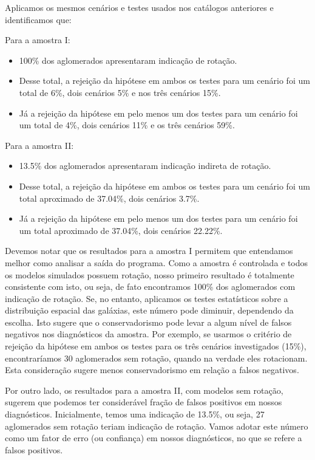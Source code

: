 Aplicamos os mesmos cenários e testes usados nos catálogos anteriores e identificamos que:

Para a amostra I:
\begin{itemize}
	\item 100\% dos aglomerados apresentaram indicação de rotação.
   	\item Desse total, a rejeição da hipótese em ambos os testes para um cenário foi um total de 6\%, dois cenários 5\% e nos três cenários 15\%.
   	\item Já a rejeição da hipótese em pelo menos um dos testes para um cenário foi um total de 4\%, dois cenários 11\% e os três cenários 59\%.
 \end{itemize} 

Para a amostra II:
\begin{itemize}
   	\item 13.5\% dos aglomerados apresentaram indicação indireta de rotação.
   	\item Desse total, a rejeição da hipótese em ambos os testes para um cenário foi um total aproximado de 37.04\%, dois cenários 3.7\%.
   	\item Já a rejeição da hipótese em pelo menos um dos testes para um cenário foi um total aproximado de 37.04\%, dois cenários 22.22\%. 
 \end{itemize} 

Devemos notar que os resultados para a amostra I permitem que entendamos melhor como analisar a saída do programa.
Como a amostra é controlada e todos os modelos simulados possuem rotação, nosso primeiro resultado é totalmente
consistente com isto, ou seja, de fato encontramos 100\% dos aglomerados com indicação de rotação. Se, no entanto, 
aplicamos os testes estatísticos sobre a distribuição espacial das galáxias, este número pode diminuir, dependendo 
da escolha. Isto sugere que o conservadorismo pode levar a algum nível de falsos negativos nos diagnósticos da amostra.
Por exemplo, se usarmos o critério de  rejeição da hipótese em ambos os testes para os três cenários investigados (15\%),
encontraríamos 30 aglomerados sem rotação, quando na verdade eles rotacionam. Esta consideração sugere 
menos conservadorismo em relação a falsos negativos.

Por outro lado, os resultados para a amostra II, com modelos sem rotação, sugerem que podemos ter considerável
fração de falsos positivos em nossos diagnósticos. Inicialmente, temos uma indicação de 13.5\%, ou seja, 27 aglomerados
sem rotação teriam indicação de rotação. Vamos adotar este número como um fator de erro (ou confiança) em nossos diagnósticos,
no que se refere a falsos positivos.


